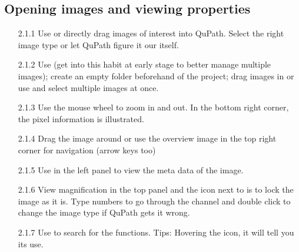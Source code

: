 \documentclass[a4paper,12pt]{article}
\begin{document}
\subsection{ Opening images and viewing properties}
\begin{enumerate}
        \item[2.1.1] \soln Use  or directly drag images of interest into QuPath. \solnend 
        Select the right image type or let QuPath figure it our itself.
       \item[2.1.2] \soln Use  \solnend (get into this habit at early stage to better manage multiple images); create an empty folder beforehand of the project; drag images in or \soln use  \solnend and select multiple images at once.
       \item[2.1.3] Use the mouse wheel to zoom in and out. In the bottom right corner, the pixel information is illustrated. 
       \item[2.1.4] Drag the image around or use the overview image in the top right corner for navigation (arrow keys too)
       \item[2.1.5] \soln Use  in the left panel to view the meta data of the image. \solnend 
       \item[2.1.6] View magnification in the top panel and the icon next to is to lock the image as it is. Type numbers to go through the channel and double click to change the image type if QuPath gets it wrong. 
       \item[2.1.7] \soln Use  \solnend to search for the functions. Tips: Hovering the icon, it will tell you its use.
\end{enumerate}
\end{document}
